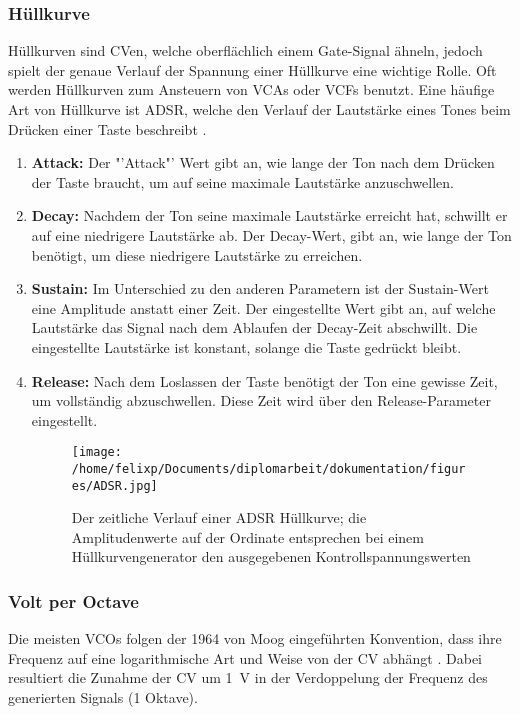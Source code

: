\subsubsection{Hüllkurve}
\label{sec:orgd0207a4}
Hüllkurven sind \acl{CV}en, welche oberflächlich einem Gate-Signal ähneln, jedoch spielt der genaue Verlauf der Spannung einer Hüllkurve eine wichtige Rolle. Oft werden Hüllkurven zum Ansteuern von \acp{VCA} oder \acp{VCF} benutzt. Eine häufige Art von Hüllkurve ist \ac{ADSR}, welche den Verlauf der Lautstärke eines Tones beim Drücken einer Taste beschreibt \cite{envelopes}.

\begin{enumerate}
\item \textbf{Attack:}
\label{sec:orged6fbd6}
Der "'Attack"' Wert gibt an, wie lange der Ton nach dem Drücken der Taste braucht, um auf seine maximale Lautstärke anzuschwellen.

\item \textbf{Decay:}
\label{sec:org4d855ed}
Nachdem der Ton seine maximale Lautstärke erreicht hat, schwillt er auf eine niedrigere Lautstärke ab. Der Decay-Wert, gibt an, wie lange der Ton benötigt, um diese niedrigere Lautstärke zu erreichen.

\item \textbf{Sustain:}
\label{sec:orgf21978e}
Im Unterschied zu den anderen Parametern ist der Sustain-Wert eine Amplitude anstatt einer Zeit. Der eingestellte Wert gibt an, auf welche Lautstärke das Signal nach dem Ablaufen der Decay-Zeit abschwillt. Die eingestellte Lautstärke ist konstant, solange die Taste gedrückt bleibt.

\item \textbf{Release:}
\label{sec:orgdf35832}
Nach dem Loslassen der Taste benötigt der Ton eine gewisse Zeit, um vollständig abzuschwellen.  Diese Zeit wird über den Release-Parameter eingestellt.

\begin{figure}[htbp]
\centering
\texttt{[image: /home/felixp/Documents/diplomarbeit/dokumentation/figures/ADSR.jpg]}
\caption{Der zeitliche Verlauf einer ADSR Hüllkurve; die Amplitudenwerte auf der Ordinate entsprechen bei einem Hüllkurvengenerator den ausgegebenen Kontrollspannungswerten  \cite{envelopes}}
\end{figure}
\end{enumerate}

\subsubsection{Volt per Octave}
\label{sec:org394337c}
Die meisten \acsp{VCO} folgen der 1964 von Moog eingeführten Konvention, dass ihre Frequenz auf eine logarithmische Art und Weise von der \acl{CV} abhängt \cite{moog1964}. Dabei resultiert die Zunahme der \acl{CV} um \SI{1}{\volt} in der Verdoppelung der Frequenz des generierten Signals (1 Oktave).

